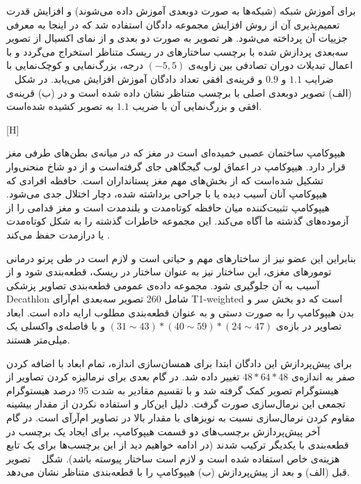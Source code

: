 برای آموزش شبکه (شبکه‌ها به صورت دوبعدی آموزش داده می‌شوند) و افزایش قدرت تعمیم‌پذیری آن از روش افزایش مجموعه دادگان استفاده شد که در اینجا به معرفی جزییات آن پرداخته می‌شود. هر تصویر به صورت دو بعدی و از نمای اکسیال از تصویر سه‌بعدی پردازش شده با برچسب ساختارهای در ریسک متناظر استخراج می‌گردد و با اعمال تبدیلات دوران تصادفی بین زاویه‌ی $(-5,5)$ درجه، بزرگ‌نمایی و کوچک‌نمایی با ضرایب $1.1$ و $0.9$ و قرینه‌ی افقی تعداد دادگان آموزش افزایش می‌یابد. در شکل ~ (الف) تصویر دوبعدی اصلی با برچسب‌ متناظر نشان داده شده است و در (ب) قرینه‌ی افقی و بزرگ‌نمایی آن با ضریب $1.1$ به تصویر کشیده شده‌است.

[H]


هیپوکامپ ساختمان عصبی خمیده‌ای است در مغز که در میانه‌ی بطن‌های طرفی مغز قرار دارد. هیپوکامپ در اعماق لوب گیجگاهی جای گرفته‌است و از دو شاخ منحنی‌وار تشکیل شده‌است که از بخش‌های مهم مغز پستانداران است. حافظه افرادی که هیپوکامپ آنان آسیب دیده یا با جراحی برداشته شده، دچار اختلال جدی می‌شود. هیپوکامپ تثبیت‌کننده میان حافظه کوتاه‌مدت و بلندمدت است و مغز قدامی را از آزموده‌های گذشته ما آگاه می‌کند. این مجموعه خاطرات گذشته را به شکل کوتاه‌مدت یا درازمدت حفظ می‌کند . 

بنابراین این عضو نیز از ساختارهای مهم و حیاتی است و لازم است در طی پرتو درمانی تومورهای مغزی، این ساختار نیز به عنوان ساختار در ریسک، قطعه‌بندی شود و از آسیب به آن جلوگیری شود. مجموعه داده‌ی عمومی قطعه‌بندی تصاویر پزشکی Decathlon  شامل 260 تصویر سه‌بعدی ام‌آرای T1-weighted است که دو بخش سر و بدن هیپوکامپ را به صورت دستی و به عنوان قطعه‌بندی مطلوب ارایه داده است. ابعاد تصاویر در بازه‌ی 
$(31\sim43)*(40\sim59)*(24\sim47)$
و با فاصله‌ی واکسلی یک میلی‌متر هستند. 

برای پیش‌پردازش این دادگان ابتدا برای همسان‌سازی اندازه، تمام ابعاد با اضافه کردن صفر به اندازه‌ی $48*64*48$ تغییر داده شد. در گام‌ بعدی برای نرمالیزه کردن تصاویر از هیستوگرام تصویر کمک گرفته شد و با تقسیم مقادیر به شدت 95 درصد هیستوگرام تجمعی این نرمال‌سازی صورت گرفت. دلیل این‌کار و استفاده نکردن از مقدار بیشینه مقاوم کردن نرمال‌سازی نسبت به نویزهای با مقدار بالا در تصاویر ام‌آرآی است. در گام آخر پیش‌پردازش برچسب‌های دو قسمت هیپوکامپ، برای ایجاد یک برچسب در قطعه‌بندی با یکدیگر ترکیب شدند (در ادامه خواهیم دید از این برچسب‌ها برای یک تابع هزینه‌ی خاص استفاده شده است و لازم است ساختار پیوسته باشد). شگل ~ تصویر قبل (الف) و بعد از پیش‌پردازش (ب) هیپوکامپ را با قطعه‌بندی متناظر نشان می‌دهد.

